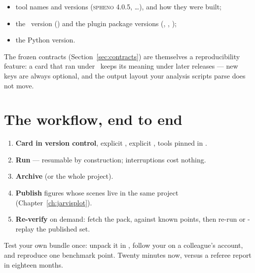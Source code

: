 \begin{itemize}
  \item tool names and versions (\textsc{spheno} 4.0.5, \ldots), and how they were
        built;
  \item the \Jtwo\ version () and the plugin package
        versions (\Portal, \Operas, \JPlot);
  \item the Python version.
\end{itemize}

\begin{jnote}
The frozen contracts (Section~\ref{sec:contracts}) are themselves a reproducibility
feature: a card that ran under \Jversion\ keeps its meaning under later releases ---
new keys are always optional, and the output layout your analysis scripts parse does
not move.
\end{jnote}

\section{The workflow, end to end}
\label{sec:repro-workflow}

\begin{enumerate}
  \item \textbf{Card in version control}, explicit , explicit
        , tools pinned in .
  \item \textbf{Run} --- resumable by construction; interruptions cost nothing.
  \item \textbf{Archive}  (or  the whole
        project).
  \item \textbf{Publish} figures whose scenes live in the same project
        (Chapter~\ref{ch:jarvisplot}).
  \item \textbf{Re-verify} on demand: fetch the pack,  against
        known points, then re-run or -replay the published set.
\end{enumerate}

\begin{jtip}
Test your own bundle once: unpack it in , follow your  on a
colleague's account, and reproduce one benchmark point. Twenty minutes now, versus a
referee report in eighteen months.
\end{jtip}

